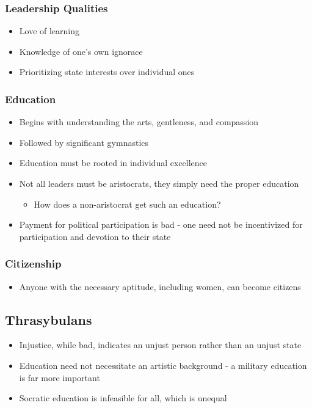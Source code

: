 \documentclass[11pt]{article}
\begin{document}
\subsubsection{Leadership Qualities}
\label{sec:orge5b3fab}
\begin{itemize}
\item Love of learning
\item Knowledge of one's own ignorace
\item Prioritizing state interests over individual ones
\end{itemize}
\subsubsection{Education}
\label{sec:orgbe088a9}
\begin{itemize}
\item Begins with understanding the arts, gentleness, and compassion
\item Followed by significant gymnastics
\item Education must be rooted in individual excellence
\item Not all leaders must be aristocrats, they simply need the proper education
\begin{itemize}
\item How does a non-aristocrat get such an education?
\end{itemize}
\item Payment for political participation is bad - one need not be incentivized for
participation and devotion to their state
\end{itemize}
\subsubsection{Citizenship}
\label{sec:org07bf998}
\begin{itemize}
\item Anyone with the necessary aptitude, including women, can become citizens
\end{itemize}
\subsection{Thrasybulans}
\label{sec:org23507ea}
\begin{itemize}
\item Injustice, while bad, indicates an unjust person rather than an unjust state
\item Education need not necessitate an artistic background - a military education is far more important
\item Socratic education is infeasible for all, which is unequal
\end{itemize}
\end{document}
